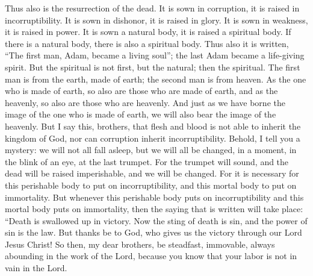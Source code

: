 \begin{biblechapter}
\verse Thus also is the resurrection of the dead. It is sown in corruption, it is raised in incorruptibility.
\verse It is sown in dishonor, it is raised in glory. It is sown in weakness, it is raised in power.
\verse It is sown a natural body, it is raised a spiritual body. If there is a natural body, there is also a spiritual body.
\verse Thus also it is written, “The first man, Adam, became a living soul”; the last Adam became a life-giving spirit.
\verse But the spiritual is not first, but the natural; then the spiritual.
\verse The first man is from the earth, made of earth; the second man is from heaven.
\verse As the one who is made of earth, so also are those who are made of earth, and as the heavenly, so also are those who are heavenly.
\verse And just as we have borne the image of the one who is made of earth, we will also bear the image of the heavenly.
\verse But I say this, brothers, that flesh and blood is not able to inherit the kingdom of God, nor can corruption inherit incorruptibility.
\verse Behold, I tell you a mystery: we will not all fall asleep, but we will all be changed,
\verse in a moment, in the blink of an eye, at the last trumpet. For the trumpet will sound, and the dead will be raised imperishable, and we will be changed.
\verse For it is necessary for this perishable body to put on incorruptibility, and this mortal body to put on immortality.
\verse But whenever this perishable body puts on incorruptibility and this mortal body puts on immortality, then the saying that is written will take place:
\verse “Death is swallowed up in victory.
\verse Now the sting of death is sin, and the power of sin is the law.
\verse But thanks be to God, who gives us the victory through our Lord Jesus Christ!
\verse So then, my dear brothers, be steadfast, immovable, always abounding in the work of the Lord, because you know that your labor is not in vain in the Lord.
\end{biblechapter}


